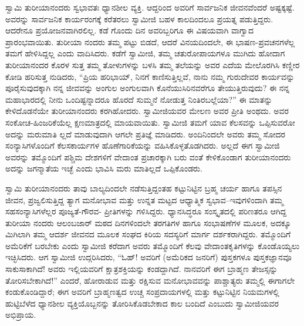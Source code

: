 ಸ್ವಾಮಿ ತುರೀಯಾನಂದರು ಸ್ವಭಾವತಃ ಧ್ಯಾನಶೀಲ ವ್ಯಕ್ತಿ. ಆದ್ದರಿಂದ ಅವರಿಗೆ ಸಾರ್ವಜನಿಕ ಜೀವನವೆಂದರೆ ಅಷ್ಟಕ್ಕಷ್ಟೆ. ಅವರನ್ನು ಸಾರ್ವಜನಿಕ ಕಾರ್ಯರಂಗಕ್ಕೆ ಕರೆತರಲು ಸ್ವಾಮೀಜಿ ಬಹಳ ಕಾಲದಿಂದಲೂ ಪ್ರಯತ್ನ ಪಡುತ್ತಿದ್ದರು. ಆದರೇನೂ ಪ್ರಯೋಜನವಾಗಿರಲಿಲ್ಲ. ಕಡೆ ಗೊಂದು ದಿನ ಅವರಿಬ್ಬರಿಗೂ ಈ ವಿಷಯವಾಗಿ ವಾಗ್ವಾದ ಪ್ರಾರಂಭವಾಯಿತು. ತುರೀಯಾ ನಂದರು ತಮ್ಮ ಪಟ್ಟು ಬಿಡದೆ, ಆದರೆ ವಿನಯದಿಂದಲೇ, ಈ ಭಾಷಣ-ಪ್ರವಚನಗಳೆಲ್ಲ ತಮಗೆ ಹೇಳಿಸಿದ್ದಲ್ಲ ಎಂದು ವಾದಿಸಿದರು. ಕಡೆಗೆ ಸ್ವಾಮೀಜಿ, ತಮ್ಮ ಚತುರೋಪಾಯಗಳೂ ಮುಗಿದು ಹೋದಾಗ ತುರೀಯಾನಂದರ ಕೊರಳ ಸುತ್ತ ತಮ್ಮ ತೋಳುಗಳನ್ನು ಬಳಸಿ ತಮ್ಮ ತಲೆಯನ್ನು ಅವರ ಎದೆಯ ಮೇಲೊರಗಿಸಿ ಕಣ್ಣೀರ ಕೋಡಿ ಹರಿಸುತ್ತ ನುಡಿದರು, “ಪ್ರಿಯ ಹರಿಭಾಯ್, ನಿನಗೆ ಕಾಣಿಸುತ್ತಿಲ್ಲವೆ, ನಾನು ನಮ್ಮ ಗುರುದೇವರ ಕಾರ್ಯವನ್ನು ಪೂರೈಸುವುದಕ್ಕಾಗಿ ನನ್ನ ಜೀವವನ್ನು ಅಂಗುಲ ಅಂಗುಲವಾಗಿ ಕೊನೆಯುಸಿರಿನವರೆಗೂ ತೇಯುತ್ತಿರುವುದು? ಈ ನನ್ನ ಮಹಾಭಾರದಲ್ಲಿ ನೀನು ಒಂದಿಷ್ಟನ್ನಾದರೂ ಹೊರದೆ ಸುಮ್ಮನೆ ನೋಡುತ್ತ ನಿಂತಿರಬಲ್ಲೆಯಾ?” ಈ ಮಾತನ್ನು ಕೇಳಿದೊಡನೆಯೇ ತುರೀಯಾನಂದರು ಕರಗಿಹೋದರು. ಸ್ವಾಮೀಜಿಯವರ ಮೇಲಣ ಅವರ ಪ್ರೀತಿ ಅಂಥದು. ಅವರ ಸಂಕೋಚ-ಹಿಂಜರಿಕೆಯೆಲ್ಲ ಕ್ಷಣಮಾತ್ರದಲ್ಲಿ ಮಾಯವಾಯಿತು. ಸ್ವಾಮೀಜಿ ತಮಗೆ ಯಾವ ಕೆಲಸವನ್ನು ಒಪ್ಪಿಸುವರೋ ಅದನ್ನು ಮರುಮಾತಿ ಲ್ಲದೆ ಮಾಡುವುದಾಗಿ ಆಗಲೇ ಪ್ರತಿಜ್ಞೆ ಮಾಡಿದರು. ಅಂದಿನಿಂದಲೇ ಅವರು ತಮ್ಮ ಸೋದರ ಸಂನ್ಯಾಸಿಗಳೊಂದಿಗೆ ಕೆಲಸಕಾರ್ಯಗಳ ಹೊಣೆಗಾರಿಕೆಯನ್ನು ವಹಿಸಿಕೊಳ್ಳತೊಡಗಿದರು. ಅಲ್ಲದೆ ಈಗ ಸ್ವಾಮೀಜಿ ಅವರನ್ನು ತಮ್ಮೊಂದಿಗೆ ಪಶ್ಚಿಮ ದೇಶಗಳಿಗೆ ವೇದಾಂತ ಪ್ರಚಾರಕ್ಕಾಗಿ ಬರು ವಂತೆ ಕೇಳಿಕೊಂಡಾಗ ತುರೀಯಾನಂದರು ಅದನ್ನು ಜಗನ್ಮಾತೆಯ ಇಚ್ಛೆ ಎಂದು ಭಾವಿಸಿ ಮರು ಮಾತಿಲ್ಲದೆ ಒಪ್ಪಿಕೊಂಡರು.

ಸ್ವಾಮಿ ತುರೀಯಾನಂದರು ತಾವು ಬಾಲ್ಯದಿಂದಲೇ ನಡೆಸುತ್ತಿದ್ದಂತಹ ಕಟ್ಟುನಿಟ್ಟಿನ ಬ್ರಹ್ಮ ಚರ್ಯ ಹಾಗೂ ತಪಸ್ಸಿನ ಜೀವನ, ಪ್ರಜ್ವಲಿಸುತ್ತಿದ್ದ ತ್ಯಾಗ ಮನೋಭಾವ ಮತ್ತು ಉನ್ನತ ಮಟ್ಟದ ಆಧ್ಯಾತ್ಮಿಕ ಸ್ವಭಾವ–ಇವುಗಳಿಂದಾಗಿ ತಮ್ಮ ಸಹಸಂನ್ಯಾಸಿಗಳೆಲ್ಲರ ಪೂಜ್ಯತೆ-ಗೌರವ- ಪ್ರೀತಿಗಳನ್ನು ಗಳಿಸಿದ್ದರು. ಧ್ಯಾನಸಿದ್ಧರೂ ಸಂಸ್ಕೃತದಲ್ಲಿ ಪರಿಣತರೂ ಆಗಿದ್ದ ತುರೀಯಾ ನಂದರು ಆಲಂಬಜಾರ್ ಮಠದ ದಿನಗಳಿಂದಲೇ ತರಗತಿಗಳ ಹಾಗೂ ಸಂಭಾಷಣೆಗಳ ಮೂಲಕ, ಅದಕ್ಕೂ ಮಿಗಿಲಾಗಿ ತಮ್ಮ ಆದರ್ಶ ಜೀವನದ ಮೂಲಕ ಸಂಘದ ಕಿರಿಯ ಸದಸ್ಯರಿಗೆ ಮಾರ್ಗ ದರ್ಶಕರಾಗಿದ್ದರು. ತಮ್ಮೊಂದಿಗೆ ಅಮೆರಿಕೆಗೆ ಬರಬೇಕು ಎಂದು ಸ್ವಾಮೀಜಿ ಕರೆದಾಗ ಅವರು ತಮ್ಮೊಂದಿಗೆ ಕೆಲವು ವೇದಾಂತಕೃತಿಗಳನ್ನು ಕೊಂಡೊಯ್ಯಲು ಇಚ್ಛಿಸಿದರು. ಆಗ ಸ್ವಾಮೀಜಿ ಉದ್ಗರಿಸಿದರು, “ಓಹ್! ಅವರಿಗೆ (ಅಮೆರಿಕದ ಜನರಿಗೆ) ಪುಸ್ತಕಗಳೂ ಪುಸ್ತಕಜ್ಞಾನವೂ ಸಾಕುಸಾಕಾಗಿದೆ! ಅವರು ಇಲ್ಲಿಯವರಿಗೆ ಕ್ಷಾತ್ರಶಕ್ತಿಯನ್ನು ಕಂಡದ್ದಾಗಿದೆ. ನಾನವರಿಗೆ ಈಗ ಬ್ರಾಹ್ಮಣ ತೇಜಸ್ಸನ್ನು ತೋರಿಸಬೇಕಾಗಿದೆ!” ಎಂದರೆ, ಹೋರಾಡುವ ಮತ್ತು ರಕ್ಷಿಸುವ ಮನೋಭಾವವನ್ನು ಪಾಶ್ಚಾತ್ಯರು ತಮ್ಮಲ್ಲಿ ಈಗಾಗಲೇ ಕಂಡುಕೊಂಡಿದ್ದಾರೆ; ಈಗ ಅವರಿಗೆ ಬ್ರಾಹ್ಮಣತ್ವದ ಉಚ್ಚ ಸಂಪ್ರದಾಯಗಳಲ್ಲಿ ಮತ್ತು ಕಟ್ಟುನಿಟ್ಟಿನ ನಿಯಮಗಳಲ್ಲಿ ಹುಟ್ಟಿಬೆಳೆದ ಧ್ಯಾನಶೀಲ ವ್ಯಕ್ತಿಯೊಬ್ಬನನ್ನು ತೋರಿಸಿಕೊಡಬೇಕಾದ ಕಾಲ ಬಂದಿದೆ ಎಂಬುದು ಸ್ವಾಮೀಜಿಯವರ ಅಭಿಪ್ರಾಯ.

